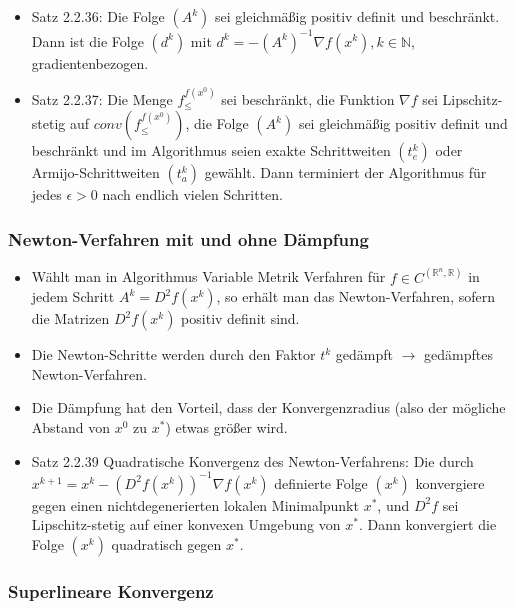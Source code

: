 \documentclass[paper=a4, fontsize=11pt]{scrartcl} %
\numberwithin{equation}{section} %
\numberwithin{figure}{section} %
\numberwithin{table}{section} %
\begin{document}
\begin{itemize}
  \item Satz 2.2.36: Die Folge $(A^k)$ sei gleichmäßig positiv definit und beschränkt. Dann ist die Folge $(d^k)$ mit $d^k = -(A^k)^{-1} \nabla f(x^k), k \in \mathbb{N}$, gradientenbezogen.
  \item Satz 2.2.37: Die Menge $f^{f(x^0)}_\le$ sei beschränkt, die Funktion $\nabla f$ sei Lipschitz-stetig auf $conv(f^{f(x^0)}_\le)$, die Folge $(A^k)$ sei gleichmäßig positiv definit und beschränkt und im Algorithmus seien exakte Schrittweiten $(t_e^k)$ oder Armijo-Schrittweiten $(t_a^k)$ gewählt. Dann terminiert der Algorithmus für jedes $\epsilon > 0$ nach endlich vielen Schritten.
\end{itemize}

\subsubsection{Newton-Verfahren mit und ohne Dämpfung}

\begin{itemize}
  \item Wählt man in Algorithmus Variable Metrik Verfahren für $f \in C^(\mathbb{R}^n,\mathbb{R})$ in jedem Schritt $A^k=D^2f(x^k)$, so erhält man das Newton-Verfahren, sofern die Matrizen $D^2f(x^k)$ positiv definit sind.
  \item Die Newton-Schritte werden durch den Faktor $t^k$ gedämpft $\rightarrow$ gedämpftes Newton-Verfahren.
  \item Die Dämpfung hat den Vorteil, dass der Konvergenzradius (also der mögliche Abstand von $x^0$ zu $x^*$) etwas größer wird.
  \item Satz 2.2.39 Quadratische Konvergenz des Newton-Verfahrens: Die durch $x^{k+1} = x^k - (D^2 f(x^k))^{-1} \nabla f(x^k)$ definierte Folge $(x^k)$ konvergiere gegen einen nichtdegenerierten lokalen Minimalpunkt $x^*$, und $D^2f$ sei Lipschitz-stetig auf einer konvexen Umgebung von $x^*$. Dann konvergiert die Folge $(x^k)$ quadratisch gegen $x^*$.
\end{itemize}

\subsubsection{Superlineare Konvergenz}
\end{document}
